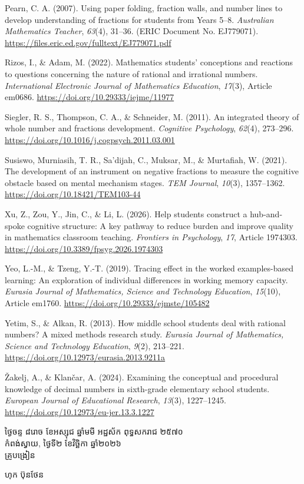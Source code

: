 \documentclass[a4paper,12pt]{article}
\begin{document}
{Pearn, C. A. (2007). Using paper folding, fraction walls, and number lines to develop understanding of fractions for students from Years 5–8. \textit{Australian Mathematics Teacher}, \textit{63}(4), 31–36. (ERIC Document No. EJ779071). \url{https://files.eric.ed.gov/fulltext/EJ779071.pdf}

Rizos, I., \& Adam, M. (2022). Mathematics students’ conceptions and reactions to questions concerning the nature of rational and irrational numbers. \textit{International Electronic Journal of Mathematics Education}, \textit{17}(3), Article em0686. \url{https://doi.org/10.29333/iejme/11977}

Siegler, R. S., Thompson, C. A., \& Schneider, M. (2011). An integrated theory of whole number and fractions development. \textit{Cognitive Psychology}, \textit{62}(4), 273–296. \url{https://doi.org/10.1016/j.cogpsych.2011.03.001}

Susiswo, Murniasih, T. R., Sa’dijah, C., Muksar, M., \& Murtafiah, W. (2021). The development of an instrument on negative fractions to measure the cognitive obstacle based on mental mechanism stages. \textit{TEM Journal}, \textit{10}(3), 1357–1362. \url{https://doi.org/10.18421/TEM103-44}

Xu, Z., Zou, Y., Jin, C., \& Li, L. (2026). Help students construct a hub-and-spoke cognitive structure: A key pathway to reduce burden and improve quality in mathematics classroom teaching. \textit{Frontiers in Psychology}, \textit{17}, Article 1974303. \url{https://doi.org/10.3389/fpsyg.2026.1974303}

Yeo, L.-M., \& Tzeng, Y.-T. (2019). Tracing effect in the worked examples-based learning: An exploration of individual differences in working memory capacity. \textit{Eurasia Journal of Mathematics, Science and Technology Education}, \textit{15}(10), Article em1760. \url{https://doi.org/10.29333/ejmste/105482}

Yetim, S., \& Alkan, R. (2013). How middle school students deal with rational numbers? A mixed methods research study. \textit{Eurasia Journal of Mathematics, Science and Technology Education}, \textit{9}(2), 213–221. \url{https://doi.org/10.12973/eurasia.2013.9211a}

Žakelj, A., \& Klančar, A. (2024). Examining the conceptual and procedural knowledge of decimal numbers in sixth-grade elementary school students. \textit{European Journal of Educational Research}, \textit{13}(3), 1227–1245. \url{https://doi.org/10.12973/eu-jer.13.3.1227}
\par}

\vspace{14pt}
\Needspace{2.2cm}
\hfill
\begin{minipage}{9.8cm}
  {\centering
    ថ្ងៃចន្ទ ៨រោច ខែអស្សុជ ឆ្នាំមមី អដ្ឋស័ក ពុទ្ធសករាជ ២៥៧០\\[2pt]
    កំពង់ស្វាយ, ថ្ងៃទី២ ខែវិច្ឆិកា ឆ្នាំ២០២៦\\[3pt]
    {\muol គ្រូបង្រៀន}\par}
  \vspace{32pt}
  \hfill{\muol ហុក ប៊ុនថែន}\hspace*{1.4cm}
\end{minipage}
\end{document}
